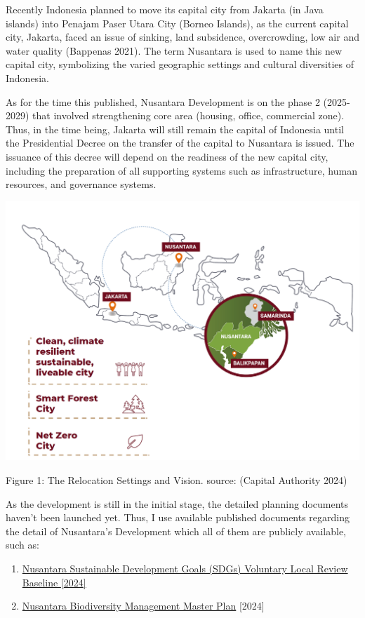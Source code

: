 \documentclass[
  letterpaper,
  DIV=11,
  numbers=noendperiod]{scrreprt}
\providecommand{\tightlist}{%
  \setlength{\itemsep}{0pt}\setlength{\parskip}{0pt}}\usepackage{longtable,booktabs,array}
\begin{document}
Recently Indonesia planned to move its capital city from Jakarta (in
Java islands) into Penajam Paser Utara City (Borneo Islands), as the
current capital city, Jakarta, faced an issue of sinking, land
subsidence, overcrowding, low air and water quality (Bappenas 2021). The
term Nusantara is used to name this new capital city, symbolizing the
varied geographic settings and cultural diversities of Indonesia.

As for the time this published, Nusantara Development is on the phase 2
(2025-2029) that involved strengthening core area (housing, office,
commercial zone). Thus, in the time being, Jakarta will still remain the
capital of Indonesia until the Presidential Decree on the transfer of
the capital to Nusantara is issued. The issuance of this decree will
depend on the readiness of the new capital city, including the
preparation of all supporting systems such as infrastructure, human
resources, and governance systems.

\includegraphics{images/clipboard-3462147358.png}

Figure 1: The Relocation Settings and Vision. source: (Capital Authority
2024)

As the development is still in the initial stage, the detailed planning
documents haven't been launched yet. Thus, I use available published
documents regarding the detail of Nusantara's Development which all of
them are publicly available, such as:

\begin{enumerate}
\def\labelenumi{\arabic{enumi}.}
\tightlist
\item
  \href{https://www.ikn.go.id/storage/pedoman-nusantara/2/nusantara-vlr-baseline-en.pdf}{Nusantara
  Sustainable Development Goals (SDGs) Voluntary Local Review Baseline
  {[}2024{]}}
\item
  \href{https://ikn.go.id/storage/pedoman-nusantara/1/nusantara-biodiversity-management-master-plan-2024.pdf}{Nusantara
  Biodiversity Management Master Plan} {[}2024{]}
\end{enumerate}
\end{document}
